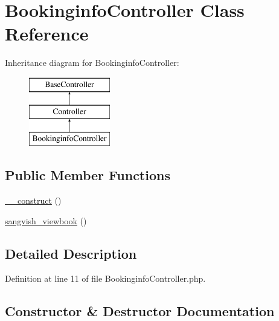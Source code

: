 \hypertarget{class_responsive_1_1_http_1_1_controllers_1_1_bookinginfo_controller}{}\section{Bookinginfo\+Controller Class Reference}
\label{class_responsive_1_1_http_1_1_controllers_1_1_bookinginfo_controller}
Inheritance diagram for Bookinginfo\+Controller\+:\begin{figure}[H]
\begin{center}
\leavevmode
\includegraphics[height=3.000000cm]{class_responsive_1_1_http_1_1_controllers_1_1_bookinginfo_controller}
\end{center}
\end{figure}
\subsection*{Public Member Functions}
\begin{DoxyCompactItemize}
\item 
\mbox{\hyperlink{class_responsive_1_1_http_1_1_controllers_1_1_bookinginfo_controller_a095c5d389db211932136b53f25f39685}{\+\_\+\+\_\+construct}} ()
\item 
\mbox{\hyperlink{class_responsive_1_1_http_1_1_controllers_1_1_bookinginfo_controller_a16061151d23f6818db0abadb45f36a60}{sangvish\+\_\+viewbook}} ()
\end{DoxyCompactItemize}


\subsection{Detailed Description}


Definition at line 11 of file Bookinginfo\+Controller.\+php.



\subsection{Constructor \& Destructor Documentation}
\mbox{\label{class_responsive_1_1_http_1_1_controllers_1_1_bookinginfo_controller_a095c5d389db211932136b53f25f39685}} 
